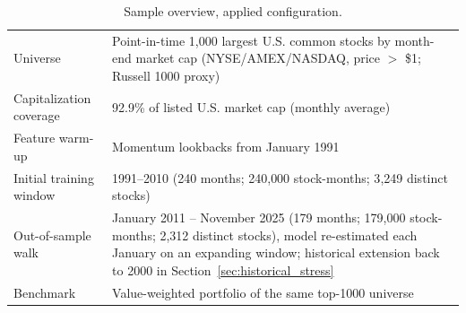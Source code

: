 \begin{table}[htbp]
\centering
\small
\begin{tabular}{l p{}}
\toprule
Universe & Point-in-time 1{,}000 largest U.S. common stocks by month-end market cap (NYSE/AMEX/NASDAQ, price $>$ \$1; Russell 1000 proxy) \\
Capitalization coverage & 92.9\% of listed U.S. market cap (monthly average) \\
Feature warm-up & Momentum lookbacks from January 1991 \\
Initial training window & 1991--2010 (240 months; 240{,}000 stock-months; 3{,}249 distinct stocks) \\
Out-of-sample walk & January 2011 -- November 2025 (179 months; 179{,}000 stock-months; 2{,}312 distinct stocks), model re-estimated each January on an expanding window; historical extension back to 2000 in Section~\ref{sec:historical_stress} \\
Benchmark & Value-weighted portfolio of the same top-1000 universe \\
\bottomrule
\end{tabular}
\caption{Sample overview, applied configuration.}
\label{tab:sample_summary}
\end{table}
